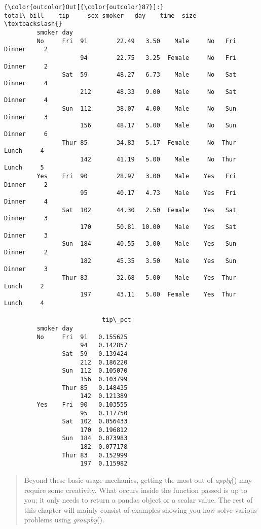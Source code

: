 \documentclass[11pt]{article}
\begin{document}
\begin{Verbatim}[commandchars=\\\{\}]
{\color{outcolor}Out[{\color{outcolor}87}]:}                  total\_bill    tip     sex smoker   day    time  size  \textbackslash{}
         smoker day                                                              
         No     Fri  91        22.49   3.50    Male     No   Fri  Dinner     2   
                     94        22.75   3.25  Female     No   Fri  Dinner     2   
                Sat  59        48.27   6.73    Male     No   Sat  Dinner     4   
                     212       48.33   9.00    Male     No   Sat  Dinner     4   
                Sun  112       38.07   4.00    Male     No   Sun  Dinner     3   
                     156       48.17   5.00    Male     No   Sun  Dinner     6   
                Thur 85        34.83   5.17  Female     No  Thur   Lunch     4   
                     142       41.19   5.00    Male     No  Thur   Lunch     5   
         Yes    Fri  90        28.97   3.00    Male    Yes   Fri  Dinner     2   
                     95        40.17   4.73    Male    Yes   Fri  Dinner     4   
                Sat  102       44.30   2.50  Female    Yes   Sat  Dinner     3   
                     170       50.81  10.00    Male    Yes   Sat  Dinner     3   
                Sun  184       40.55   3.00    Male    Yes   Sun  Dinner     2   
                     182       45.35   3.50    Male    Yes   Sun  Dinner     3   
                Thur 83        32.68   5.00    Male    Yes  Thur   Lunch     2   
                     197       43.11   5.00  Female    Yes  Thur   Lunch     4   
         
                           tip\_pct  
         smoker day                 
         No     Fri  91   0.155625  
                     94   0.142857  
                Sat  59   0.139424  
                     212  0.186220  
                Sun  112  0.105070  
                     156  0.103799  
                Thur 85   0.148435  
                     142  0.121389  
         Yes    Fri  90   0.103555  
                     95   0.117750  
                Sat  102  0.056433  
                     170  0.196812  
                Sun  184  0.073983  
                     182  0.077178  
                Thur 83   0.152999  
                     197  0.115982  
\end{Verbatim}
            
    \begin{quote}
Beyond these basic usage mechanics, getting the most out of
\emph{apply}() may require some creativity. What occurs inside the
function passed is up to you; it only needs to return a pandas object or
a scalar value. The rest of this chapter will mainly consist of examples
showing you how solve various problems using \emph{groupby}().
\end{quote}
\end{document}
